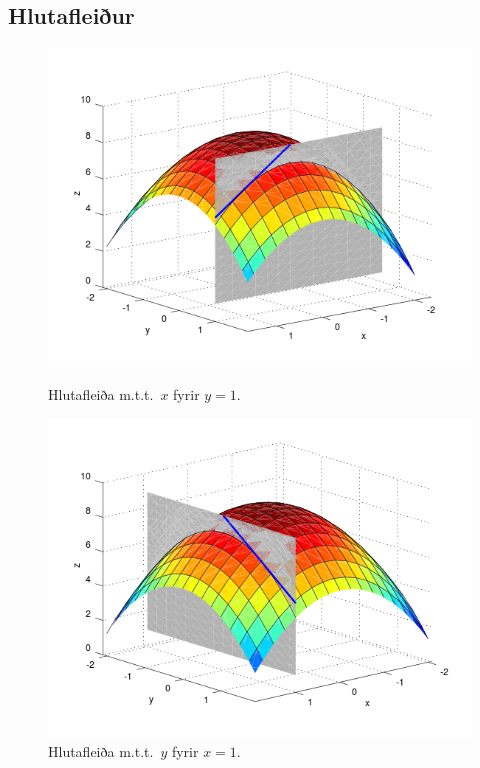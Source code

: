 \subsection{Hlutafleiður}
 \begin{figure}[!h]
        \centering
        \begin{minipage}{.5\textwidth}
            \centering
            \includegraphics[width=1\linewidth]{xpart.png}
            \caption*{Hlutafleiða m.t.t.~$x$ fyrir $y=1$.}
        \end{minipage}%
        \begin{minipage}{.5\textwidth}
            \centering
            \includegraphics[width=1\linewidth]{ypart.png}
            \caption*{Hlutafleiða m.t.t.~$y$ fyrir $x=1$.}
        \end{minipage}
    \end{figure}
 



